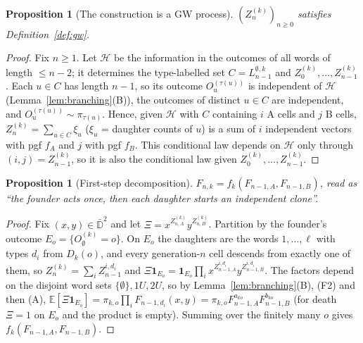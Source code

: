 \documentclass[11pt]{article}
\newtheorem{proposition}[theorem]{Proposition}
\theoremstyle{definition}
\theoremstyle{remark}
\newcommand{\E}{\mathbb{E}}
\newcommand{\Dbar}{\bar{\mathbb D}^2}
\newcommand{\one}{\mathbf 1}
\begin{document}
\begin{proposition}[The construction is a GW process]\label{prop:construction}
$(Z^{(k)}_n)_{n\ge0}$ satisfies Definition~\ref{def:gw}.
\end{proposition}
\begin{proof}
Fix $n\ge1$. Let $\mathcal H$ be the information in the outcomes of all words of length $\le n-2$; it determines the type-labelled set $C=L^{\emptyset,k}_{n-1}$ and $Z^{(k)}_0,\dots,Z^{(k)}_{n-1}$. Each $u\in C$ has length $n-1$, so its outcome $O_u^{(\tau(u))}$ is independent of $\mathcal H$ (Lemma~\ref{lem:branching}(B)), the outcomes of distinct $u\in C$ are independent, and $O^{(\tau(u))}_u\sim\pi_{\tau(u)}$. Hence, given $\mathcal H$ with $C$ containing $i$ A cells and $j$ B cells, $Z^{(k)}_n=\sum_{u\in C}\xi_u$ ($\xi_u$ = daughter counts of $u$) is a sum of $i$ independent vectors with pgf $f_A$ and $j$ with pgf $f_B$. This conditional law depends on $\mathcal H$ only through $(i,j)=Z^{(k)}_{n-1}$, so it is also the conditional law given $Z^{(k)}_0,\dots,Z^{(k)}_{n-1}$.
\end{proof}

\begin{proposition}[First-step decomposition]\label{prop:firststep}
$F_{n,k}=f_k(F_{n-1,A},F_{n-1,B})$, read as ``the founder acts once, then each daughter starts an independent clone''.
\end{proposition}
\begin{proof}
Fix $(x,y)\in\Dbar$ and let $\Xi=x^{Z^{(k)}_{n,A}}y^{Z^{(k)}_{n,B}}$. Partition by the founder's outcome $E_o=\{O^{(k)}_\emptyset=o\}$. On $E_o$ the daughters are the words $1,\dots,\ell$ with types $d_i$ from $D_k(o)$, and every generation-$n$ cell descends from exactly one of them, so $Z^{(k)}_n=\sum_iZ^{i,d_i}_{n-1}$ and $\Xi\one_{E_o}=\one_{E_o}\prod_ix^{Z^{i,d_i}_{n-1,A}}y^{Z^{i,d_i}_{n-1,B}}$. The factors depend on the disjoint word sets $\{\emptyset\},1U,2U$, so by Lemma~\ref{lem:branching}(B), (F2) and then (A), $\E[\Xi\one_{E_o}]=\pi_{k,o}\prod_iF_{n-1,d_i}(x,y)=\pi_{k,o}F_{n-1,A}^{a_{ko}}F_{n-1,B}^{b_{ko}}$ (for death $\Xi=1$ on $E_o$ and the product is empty). Summing over the finitely many $o$ gives $f_k(F_{n-1,A},F_{n-1,B})$.
\end{proof}

\end{document}
